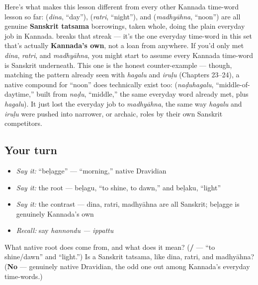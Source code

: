 \begin{culture}
Here's what makes this lesson different from every other Kannada time-word lesson so far: \textbf{} (\emph{dina}, \textquotedblleft{}day\textquotedblright{}), \textbf{} (\emph{ratri}, \textquotedblleft{}night\textquotedblright{}), and \textbf{} (\emph{madhyāhna}, \textquotedblleft{}noon\textquotedblright{}) are all genuine \textbf{Sanskrit tatsama} borrowings, taken whole, doing the plain everyday job in Kannada. \textbf{} breaks that streak — it's the one everyday time-word in this set that's actually \textbf{Kannada's own}, not a loan from anywhere. If you'd only met \emph{dina}, \emph{ratri}, and \emph{madhyāhna}, you might start to assume every Kannada time-word is Sanskrit underneath. This one is the honest counter-example — though, matching the pattern already seen with \emph{hagalu} and \emph{iruḷu} (Chapters 23–24), a native compound for \textquotedblleft{}noon\textquotedblright{} does technically exist too: \textbf{} (\emph{naḍuhagalu}, \textquotedblleft{}middle-of-daytime,\textquotedblright{} built from \emph{naḍu}, \textquotedblleft{}middle,\textquotedblright{} the same everyday word already met, plus \emph{hagalu}). It just lost the everyday job to \emph{madhyāhna}, the same way \emph{hagalu} and \emph{iruḷu} were pushed into narrower, or archaic, roles by their own Sanskrit competitors.
\end{culture}

\subsection*{Your turn}
\begin{itemize}
\raggedright
  \item \emph{Say it:} \textquotedblleft{}beḷagge\textquotedblright{} — \textquotedblleft{}morning,\textquotedblright{} native Dravidian
  \item \emph{Say it:} the root — beḷagu, \textquotedblleft{}to shine, to dawn,\textquotedblright{} and beḷaku, \textquotedblleft{}light\textquotedblright{}
  \item \emph{Say it:} the contrast — dina, ratri, madhyāhna are all Sanskrit; beḷagge is genuinely Kannada's own
  \item \emph{Recall:} say \emph{hannondu — ippattu}
\end{itemize}

\begin{tcolorbox}[breakable,colback=teal!4,colframe=teal!35!black,title={Before you move on}]
What native root does  come from, and what does it mean? (\textbf{/} — \textquotedblleft{}to shine/dawn\textquotedblright{} and \textquotedblleft{}light.\textquotedblright{}) Is  a Sanskrit tatsama, like dina, ratri, and madhyāhna? (\textbf{No} — genuinely native Dravidian, the odd one out among Kannada's everyday time-words.)
\end{tcolorbox}
